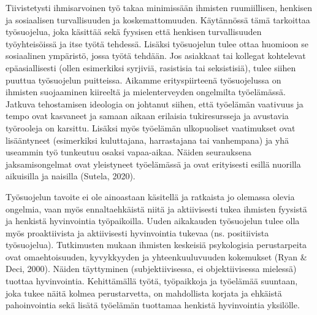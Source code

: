 \documentclass[nobib,finnish,oneside,openany,notoc,a4paper]{tufte-book}
\begin{document}
Tiivistetysti ihmisarvoinen työ takaa minimissään ihmisten ruumiillisen,
henkisen ja sosiaalisen turvallisuuden ja koskemattomuuden. Käytännössä
tämä tarkoittaa työsuojelua, joka käsittää sekä fyysisen että henkisen
turvallisuuden työyhteisöissä ja itse työtä tehdessä. Lisäksi
työsuojelun tulee ottaa huomioon se sosiaalinen ympäristö, jossa työtä
tehdään. Jos asiakkaat tai kollegat kohtelevat epäasiallisesti (ollen
esimerkiksi syrjiviä, rasistisia tai seksistisiä), tulee siihen puuttua
työsuojelun puitteissa. Aikamme erityspiirteenä työsuojelussa on
ihmisten suojaaminen kiireeltä ja mielenterveyden ongelmilta
työelämässä. Jatkuva tehostamisen ideologia on johtanut siihen, että
työelämän vaativuus ja tempo ovat kasvaneet ja samaan aikaan erilaisia
tukiresursseja ja avustavia työrooleja on karsittu. Lisäksi myös
työelämän ulkopuoliset vaatimukset ovat lisääntyneet (esimerkiksi
kuluttajana, harrastajana tai vanhempana) ja yhä useammin työ tunkeutuu
osaksi vapaa-aikaa. Näiden seurauksena jaksamisongelmat ovat yleistyneet
työelämässä ja ovat erityisesti esillä nuorilla aikuisilla ja naisilla
(Sutela, 2020).

Työsuojelun tavoite ei ole ainoastaan käsitellä ja ratkaista jo olemassa
olevia ongelmia, vaan myös ennaltaehkäistä niitä ja aktiivisesti tukea
ihmisten fyysistä ja henkistä hyvinvointia työpaikoilla. Uuden
aikakauden työsuojelun tulee olla myös proaktiivista ja aktiivisesti
hyvinvointia tukevaa (ns. positiivista työsuojelua). Tutkimusten mukaan
ihmisten keskeisiä psykologisia perustarpeita ovat omaehtoisuuden,
kyvykkyyden ja yhteenkuuluvuuden kokemukset (Ryan \& Deci, 2000). Näiden
täyttyminen (subjektiivisessa, ei objektiivisessa mielessä) tuottaa
hyvinvointia. Kehittämällä työtä, työpaikkoja ja työelämää suuntaan,
joka tukee näitä kolmea perustarvetta, on mahdollista korjata ja
ehkäistä pahoinvointia sekä lisätä työelämän tuottamaa henkistä
hyvinvointia yksilölle.
\end{document}

